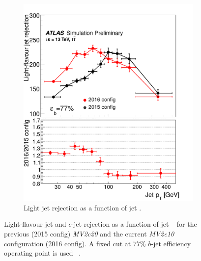 \begin{figure}[htbp!]
\begin{subfigure}[b]{0.4\textwidth}
        \includegraphics[width=\textwidth]{figures/object/light_rej_pt}
        \caption{Light jet rejection as a function of jet \pt.}
        \label{fig:obj_light_rej}
    \end{subfigure}
\caption{Light-flavour jet and $c$-jet rejection as a function of jet \pt~ for the previous (2015 config) \emph{MV2c20} and the current \emph{MV2c10} configuration (2016 config). A fixed cut at 77\% $b$-jet efficiency operating point is used ~\cite{btaggingRun2}.}
\label{fig:obj_btag_rej}
\end{figure}


